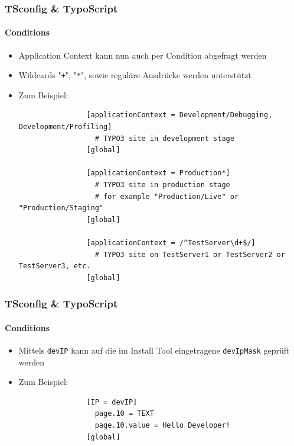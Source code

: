 \begin{frame}[fragile]
	\frametitle{TSconfig \& TypoScript}
	\framesubtitle{Conditions}

	\begin{itemize}
		\item Application Context kann nun auch per Condition abgefragt werden
		\item Wildcards "\texttt{+}", "\texttt{*}", sowie reguläre Ausdrücke werden unterstützt
		\item Zum Beispiel:

			\lstset{
				basicstyle=\tiny\ttfamily
			}

			\begin{lstlisting}
				[applicationContext = Development/Debugging, Development/Profiling]
				  # TYPO3 site in development stage
				[global]

				[applicationContext = Production*]
				  # TYPO3 site in production stage
				  # for example "Production/Live" or "Production/Staging"
				[global]

				[applicationContext = /^TestServer\d+$/]
				  # TYPO3 site on TestServer1 or TestServer2 or TestServer3, etc.
				[global]
			\end{lstlisting}

	\end{itemize}

\end{frame}


\begin{frame}[fragile]
	\frametitle{TSconfig \& TypoScript}
	\framesubtitle{Conditions}

	\begin{itemize}

		\item Mittels \texttt{devIP} kann auf die im Install Tool eingetragene \texttt{devIpMask} geprüft werden
		\item Zum Beispiel:

			\begin{lstlisting}
				[IP = devIP]
				  page.10 = TEXT
				  page.10.value = Hello Developer!
				[global]
			\end{lstlisting}

	\end{itemize}

\end{frame}

